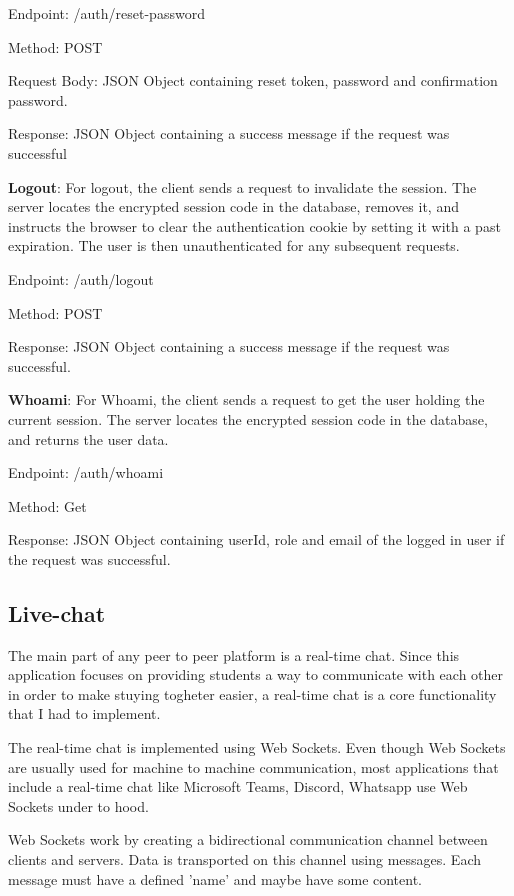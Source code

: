 Endpoint: /auth/reset-password

Method: POST

Request Body: JSON Object containing reset token, password and confirmation password.

Response: JSON Object containing a success message if the request was successful


\textbf{Logout}: For logout, the client sends a request to invalidate the session. The server locates the encrypted session code in the database, removes it, and instructs the browser to clear the authentication cookie by setting it with a past expiration. The user is then unauthenticated for any subsequent requests.

Endpoint: /auth/logout

Method: POST

Response: JSON Object containing a success message if the request was successful.

\textbf{Whoami}: For Whoami, the client sends a request to get the user holding the current session. The server locates the encrypted session code in the database, and returns the user data.

Endpoint: /auth/whoami

Method: Get

Response: JSON Object containing userId, role and email of the logged in user if the request was successful.

\subsection{Live-chat}
The main part of any peer to peer platform is a real-time chat. Since this application focuses on providing students a way to communicate with each other in order to make stuying togheter easier, a real-time chat is a core functionality that I had to implement.

The real-time chat is implemented using Web Sockets\cite{WEB_SOCKET}. Even though Web Sockets are usually used for machine to machine communication, most applications that include a real-time chat like Microsoft Teams, Discord, Whatsapp use Web Sockets under to hood.

Web Sockets work by creating a bidirectional communication channel between clients and servers. Data is transported on this channel using messages. Each message must have a defined 'name' and maybe have some content.

